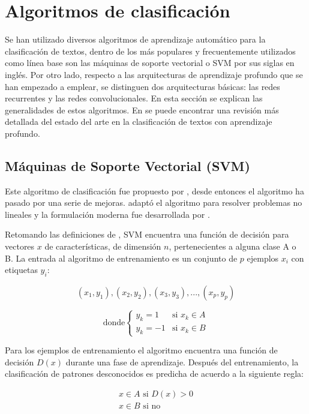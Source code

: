 \section{Algoritmos de clasificación}
Se han utilizado diversos algoritmos de aprendizaje automático para la clasificación de textos, dentro de los más populares y frecuentemente utilizados como línea base son las máquinas de soporte vectorial o SVM por sus siglas en inglés. Por otro lado, respecto a las arquitecturas de aprendizaje profundo que se han empezado a emplear, se distinguen dos arquitecturas básicas: las redes recurrentes y las redes convolucionales. En esta sección se explican las generalidades de estos algoritmos. En \citep{Minaee2020} se puede encontrar una revisión más detallada del estado del arte en la clasificación de textos con aprendizaje profundo.


\subsection{Máquinas de Soporte Vectorial (SVM)}
Este algoritmo de clasificación fue propuesto por \citep{vapnik1964class}, desde entonces el algoritmo ha pasado por una serie de mejoras. \citep{boser1992training} adaptó el algoritmo para resolver problemas no lineales y la formulación moderna fue desarrollada por \citep{cortes1995support}.

Retomando las definiciones de \citep{boser1992training}, SVM encuentra una función de decisión para vectores $x$ de características, de dimensión $n$, pertenecientes a alguna clase A o B. La entrada al algoritmo de entrenamiento es un conjunto de $p$ ejemplos $x_i$ con etiquetas $y_i$:

\begin{equation} \label{eq:training}
(x_1, y_1), (x_2, y_2), (x_3, y_3), ... , (x_p, y_p) 
\end{equation}

\[
    \text{donde}
    \begin{cases}
        y_k=1 & \text{si $x_k \in A$}\\
        y_k=-1 & \text{si $x_k \in B$}
    \end{cases}
\]

Para los ejemplos de entrenamiento el algoritmo encuentra una función de decisión $D(x)$ durante una fase de aprendizaje. Después del entrenamiento, la clasificación de patrones desconocidos es predicha de acuerdo a la siguiente regla:

\begin{equation} \label{eq:svm_de}
\begin{split}
    x \in A \text{ si } D(x)>0 \\
    x \in B \text{ si no } 
\end{split}
\end{equation}

